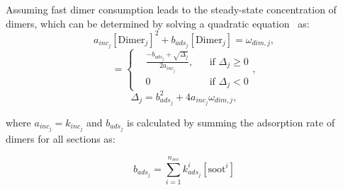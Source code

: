 Assuming fast dimer consumption leads to the steady-state concentration of dimers, which can be determined by solving a quadratic equation~\citep{blanquart2009analyzing} as:
\begin{equation}
	a_{inc_j}[\mathrm{Dimer}_j]^2+b_{ads_j}[\mathrm{Dimer}_j]=\omega_{dim,j},
	\label{eqn:quad_dimcoal}
\end{equation}
\begin{equation}
	[\mathrm{Dimer}_j]=
	\left\{
	\begin{aligned}
		&\frac{-b_{ads_j}+\sqrt{\Delta_j}}{2a_{inc_j}},
		&&
		\text{if } \Delta_j \ge 0
		\\
		& 0 
		&&
		\text{if } \Delta_j < 0
	\end{aligned},
	\right.
	\label{eqn:dimer_dimcoal}
\end{equation}
\begin{equation}
	\Delta_j = b_{ads_j}^2+4a_{inc_j}\omega_{dim,j},
	\label{eqn:delta_dimcoal}
\end{equation}

\noindent where ${a_{inc_j} = k_{inc_{j}}}$ and ${b_{ads_j}}$ is calculated by summing the adsorption rate of dimers for all sections as:

\begin{equation}
	b_{ads_j} = \sum_{i=1}^{n_{sec}} k^i_{ads_{j}} [\mathrm{soot}^i]
\end{equation}


